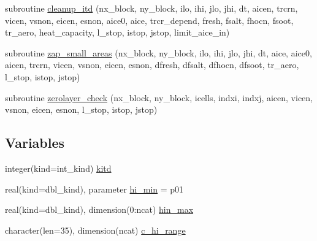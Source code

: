\begin{DoxyCompactItemize}
\item 
subroutine \hyperlink{namespaceice__itd_a3e9112301701b3265ffbd9273598a98d}{cleanup\_\-itd} (nx\_\-block, ny\_\-block, ilo, ihi, jlo, jhi, dt, aicen, trcrn, vicen, vsnon, eicen, esnon, aice0, aice, trcr\_\-depend, fresh, fsalt, fhocn, fsoot, tr\_\-aero, heat\_\-capacity, l\_\-stop, istop, jstop, limit\_\-aice\_\-in)
\item 
subroutine \hyperlink{namespaceice__itd_a137780a223f20265133e26e9e96d36a5}{zap\_\-small\_\-areas} (nx\_\-block, ny\_\-block, ilo, ihi, jlo, jhi, dt, aice, aice0, aicen, trcrn, vicen, vsnon, eicen, esnon, dfresh, dfsalt, dfhocn, dfsoot, tr\_\-aero, l\_\-stop, istop, jstop)
\item 
subroutine \hyperlink{namespaceice__itd_a55c2adda4305308869dac586cefe447a}{zerolayer\_\-check} (nx\_\-block, ny\_\-block, icells, indxi, indxj, aicen, vicen, vsnon, eicen, esnon, l\_\-stop, istop, jstop)
\end{DoxyCompactItemize}
\subsection*{Variables}
\begin{DoxyCompactItemize}
\item 
integer(kind=int\_\-kind) \hyperlink{namespaceice__itd_abda5299945828ac5cca9a7e6522991e3}{kitd}
\item 
real(kind=dbl\_\-kind), parameter \hyperlink{namespaceice__itd_a096dec1f870d22da21163b6dcacb1d2c}{hi\_\-min} = p01
\item 
real(kind=dbl\_\-kind), dimension(0:ncat) \hyperlink{namespaceice__itd_aa7b9ac33772390c73597dec2ed768aba}{hin\_\-max}
\item 
character(len=35), dimension(ncat) \hyperlink{namespaceice__itd_a679cef320723f15b41bdfc5811701cea}{c\_\-hi\_\-range}
\end{DoxyCompactItemize}


